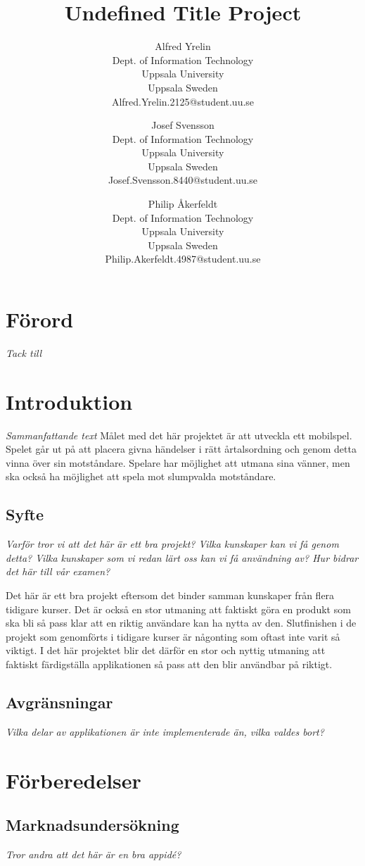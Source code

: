 \documentclass[11pt,a4paper]{article}
\author{
Alfred Yrelin \\
\textup{Dept. of Information Technology}\\
\textup{Uppsala University}\\
\textup{Uppsala Sweden}\\
\textup{Alfred.Yrelin.2125@student.uu.se}
\and 
Josef Svensson \\
\textup{Dept. of Information Technology}\\
\textup{Uppsala University}\\
\textup{Uppsala Sweden}\\
\textup{Josef.Svensson.8440@student.uu.se}
\and
Philip Åkerfeldt \\
\textup{Dept. of Information Technology}\\
\textup{Uppsala University}\\
\textup{Uppsala Sweden}\\
\textup{Philip.Akerfeldt.4987@student.uu.se}
}
\title{Undefined Title Project}
\begin{document}
\maketitle

\newpage
\section{Förord}
\textit{Tack till}

\newpage
\tableofcontents

\section{Introduktion}
\textit{Sammanfattande text}
Målet med det här projektet är att utveckla ett mobilspel. Spelet går ut på att placera givna händelser i rätt årtalsordning och genom detta vinna över sin motståndare. Spelare har möjlighet att utmana sina vänner, men ska också ha möjlighet att spela mot slumpvalda motståndare. 

\subsection{Syfte}
\textit{Varför tror vi att det här är ett bra projekt?
Vilka kunskaper kan vi få genom detta?
Vilka kunskaper som vi redan lärt oss kan vi få användning av?
Hur bidrar det här till vår examen?}


Det här är ett bra projekt eftersom det binder samman kunskaper från flera tidigare kurser. Det är också en stor utmaning att faktiskt göra en produkt som ska bli så pass klar att en riktig användare kan ha nytta av den. Slutfinishen i de projekt som genomförts i tidigare kurser är någonting som oftast inte varit så viktigt. I det här projektet blir det därför en stor och nyttig utmaning att faktiskt färdigställa applikationen så pass att den blir användbar på riktigt. 

\subsection{Avgränsningar}
\textit{Vilka delar av applikationen är inte implementerade än, vilka valdes bort?}

\section{Förberedelser}

\subsection{Marknadsundersökning}
\textit{Tror andra att det här är en bra appidé?}
\end{document}
